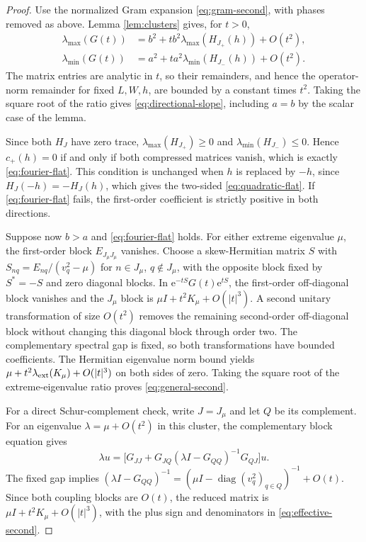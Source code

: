 \documentclass[10pt,twoside,final]{siamart1116}
\numberwithin{equation}{section}
\numberwithin{theorem}{section}
\newcommand{\diag}{\operatorname{diag}}
\newcommand{\e}{\mathrm e}
\begin{document}
\begin{proof}
Use the normalized Gram expansion \eqref{eq:gram-second}, with phases
removed as above. Lemma \ref{lem:clusters} gives, for $t>0$,
\begin{align*}
\lambda_{\max}(G(t))&=b^2+t b^2\lambda_{\max}(H_{J_+}(h))+O(t^2),\\
\lambda_{\min}(G(t))&=a^2+t a^2\lambda_{\min}(H_{J_-}(h))+O(t^2).
\end{align*}
The matrix entries are analytic in $t$, so their remainders, and hence the
operator-norm remainder for fixed $L,W,h$, are bounded by a constant times $t^2$.
Taking the square root of the ratio gives \eqref{eq:directional-slope}, including
$a=b$ by the scalar case of the lemma.

Since both $H_J$ have zero trace, $\lambda_{\max}(H_{J_+})\ge0$ and
$\lambda_{\min}(H_{J_-})\le0$. Hence $c_+(h)=0$ if and only if both compressed matrices
vanish, which is exactly \eqref{eq:fourier-flat}. This condition is unchanged when $h$
is replaced by $-h$, since $H_J(-h)=-H_J(h)$, which gives the two-sided
\eqref{eq:quadratic-flat}. If \eqref{eq:fourier-flat} fails, the first-order
coefficient is strictly positive in both directions.

Suppose now $b>a$ and \eqref{eq:fourier-flat} holds. For either extreme
eigenvalue $\mu$, the first-order block $E_{J_\mu J_\mu}$ vanishes.
Choose a skew-Hermitian matrix $S$ with
$S_{nq}=E_{nq}/(v_q^2-\mu)$ for $n\in J_\mu$, $q\notin J_\mu$,
with the opposite block fixed by $S^*=-S$ and zero diagonal blocks.
In $\e^{-tS}G(t)\e^{tS}$, the first-order off-diagonal block vanishes and the
$J_\mu$ block is $\mu I+t^2K_\mu+O(|t|^3)$. A second unitary transformation
of size $O(t^2)$ removes the remaining second-order off-diagonal block without
changing this diagonal block through order two. The complementary spectral gap
is fixed, so both transformations have bounded coefficients. The Hermitian
eigenvalue norm bound yields $\mu+t^2\lambda_{\rm ext}(K_\mu)+O(|t|^3)$
on both sides of zero. Taking the square root of the extreme-eigenvalue ratio
proves \eqref{eq:general-second}.

For a direct Schur-complement check, write $J=J_\mu$ and let $Q$ be its
complement. For an eigenvalue $\lambda=\mu+O(t^2)$ in this cluster, the
complementary block equation gives
\[
\lambda u=\bigl[G_{JJ}+G_{JQ}(\lambda I-G_{QQ})^{-1}G_{QJ}\bigr]u.
\]
The fixed gap implies
$(\lambda I-G_{QQ})^{-1}=(\mu I-\diag(v_q^2)_{q\in Q})^{-1}+O(t)$.
Since both coupling blocks are $O(t)$, the reduced matrix is
$\mu I+t^2K_\mu+O(|t|^3)$, with the plus sign and denominators in
\eqref{eq:effective-second}.


\end{proof}
\end{document}
